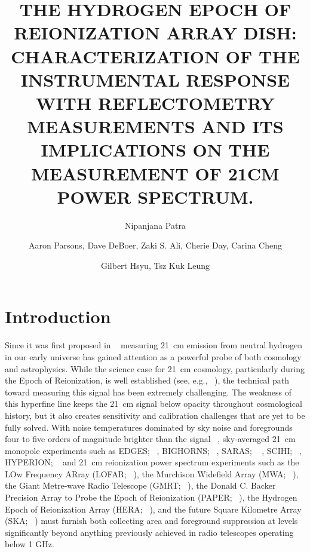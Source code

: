 \documentclass[twocolumn]{emulateapj}
\begin{document}
\title{THE HYDROGEN EPOCH OF REIONIZATION ARRAY DISH: CHARACTERIZATION OF  THE INSTRUMENTAL RESPONSE WITH REFLECTOMETRY MEASUREMENTS AND ITS IMPLICATIONS ON THE MEASUREMENT OF 21CM POWER SPECTRUM. } 

\author{Nipanjana Patra }
\author{Aaron Parsons, Dave DeBoer, Zaki S. Ali, Cherie Day, Carina Cheng}
\author{Gilbert Hsyu, Tsz Kuk Leung}

\begin{abstract}
\end{abstract}


\section{\textbf{Introduction}}

Since it was first proposed in ~\citep{Shaver_et_al1999} measuring 21~cm
emission from neutral hydrogen in our early universe has gained attention as a
powerful probe of both cosmology and astrophysics.  While the science case for
21~cm cosmology, particularly during the Epoch of Reionization, is well
established (see, e.g.,
~\cite{furlanetto_et_al2006, morales_wyithe2010, pritchard_loeb2012}),
the technical path toward measuring this signal has been extremely challenging.  The
weakness of this hyperfine line keeps the 21~cm signal below opacity throughout
cosmological history, but it also creates sensitivity and calibration
challenges that are yet to be fully solved.  With noise temperatures dominated
by sky noise and foregrounds four to five orders of magnitude
brighter than the signal ~\citep{2015ApJ...801..138P}, 
sky-averaged 21~cm monopole experiments such as
EDGES; ~\citep{Bowman_et_al2010},
BIGHORNS; ~\citealt{XXX},
SARAS; ~\citep{Patra_et_al2015} ,
SCIHI; ~\citep{2015PhDT........65V},
HYPERION; ~\citep{presley_et_al2015}
and 21~cm reionization power spectrum experiments such as
the LOw Frequency ARray (LOFAR; ~\citealt{XXX}),
the Murchison Widefield Array (MWA; ~\citealt{XXX}),
the Giant Metre-wave Radio Telescope (GMRT; ~\citealt{XXX}),
the Donald C. Backer Precision Array to Probe the Epoch of Reionization (PAPER; ~\citealt{parsons_et_al2010}),
the Hydrogen Epoch of Reionization Array (HERA; ~\citealt{XXX}),
and the future Square Kilometre Array (SKA; ~\citealt{XXX})
must
furnish both collecting area and foreground suppression at levels significantly
beyond anything previously achieved in radio telescopes operating below 1 GHz.
\end{document}

